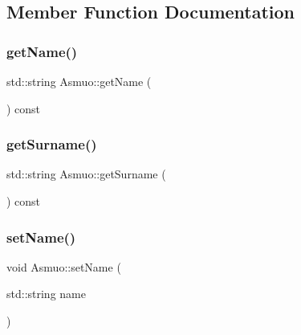 \subsection{Member Function Documentation}
\mbox{\label{class_asmuo_ab87e009f24294baf12d682eb233d5f55}} 
\subsubsection{\texorpdfstring{getName()}{getName()}}
{\footnotesize\ttfamily std\+::string Asmuo\+::get\+Name (\begin{DoxyParamCaption}{ }\end{DoxyParamCaption}) const\hspace{0.3cm}{\ttfamily [inline]}}

\mbox{\label{class_asmuo_aafbcab38fb6767fe1738c37957c9fb81}} 
\subsubsection{\texorpdfstring{getSurname()}{getSurname()}}
{\footnotesize\ttfamily std\+::string Asmuo\+::get\+Surname (\begin{DoxyParamCaption}{ }\end{DoxyParamCaption}) const\hspace{0.3cm}{\ttfamily [inline]}}

\mbox{\label{class_asmuo_aa83023f021ee29d725a21487ac2767b4}} 
\subsubsection{\texorpdfstring{setName()}{setName()}}
{\footnotesize\ttfamily void Asmuo\+::set\+Name (\begin{DoxyParamCaption}\item[{std\+::string}]{name }\end{DoxyParamCaption})\hspace{0.3cm}{\ttfamily [inline]}}

\mbox{\label{class_asmuo_a4fd16c3f4ac603387225449e7ded2dc3}} 
